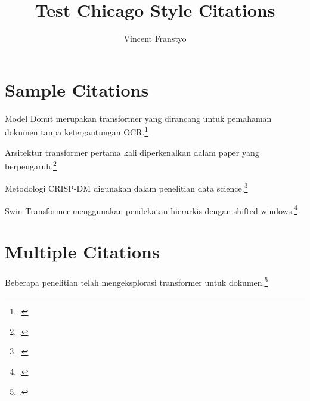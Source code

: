 \documentclass[12pt,a4paper]{article}
\begin{document}
\title{Test Chicago Style Citations}
\author{Vincent Franstyo}
\date{}
\maketitle

\section{Sample Citations}

Model Donut merupakan transformer yang dirancang untuk pemahaman dokumen tanpa ketergantungan OCR.\footcite{kim2021donut}

Arsitektur transformer pertama kali diperkenalkan dalam paper yang berpengaruh.\footcite{vaswani2017attention}

Metodologi CRISP-DM digunakan dalam penelitian data science.\footcite{saltz2021crisp}

Swin Transformer menggunakan pendekatan hierarkis dengan shifted windows.\footcite{liu2021swin}

\section{Multiple Citations}

Beberapa penelitian telah mengeksplorasi transformer untuk dokumen.\footcite{kim2021donut,vaswani2017attention,liu2021swin}

\printbibliography[title=Daftar Pustaka]
\end{document}
